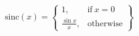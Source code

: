$\mathrm{sinc}(x) = \left\{ \begin{array}{ll} 1, & \mathrm{if} \ x = 0 \\ \frac{\sin x}{x}, & \mathrm{otherwise} \end{array} \right\}$